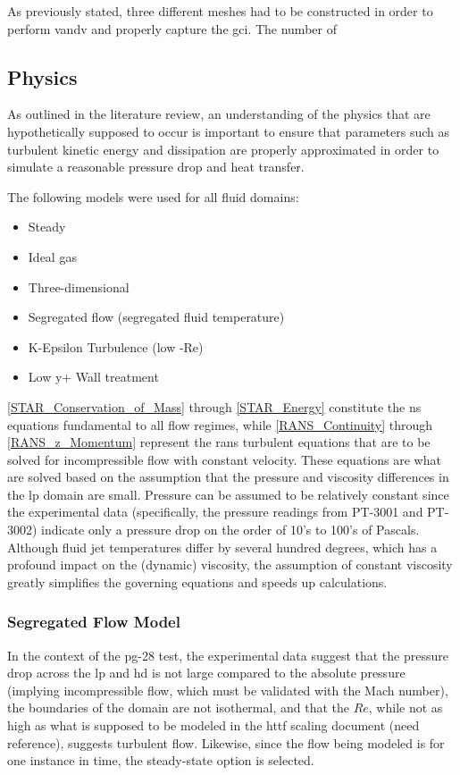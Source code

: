 \documentclass[double,12pt]{beavtex}
\begin{document}
As previously stated, three different meshes had to be constructed in order to perform \acrshort{vandv} and properly capture the \acrshort{gci}. The number of 

\subsection{Physics}

As outlined in the literature review, an understanding of the physics that are hypothetically supposed to occur is important to ensure that parameters such as turbulent kinetic energy and dissipation are properly approximated in order to simulate a reasonable pressure drop and heat transfer.

The following models were used for all fluid domains:
\begin{itemize}
    \item Steady
    \item Ideal gas
    \item Three-dimensional
    \item Segregated flow (segregated fluid temperature)
    \item K-Epsilon Turbulence (low -Re)
    \item Low y+ Wall treatment
\end{itemize}

\ref{STAR_Conservation_of_Mass} through \ref{STAR_Energy} constitute the \acrshort{ns} equations fundamental to all flow regimes, while \ref{RANS_Continuity} through \ref{RANS_z_Momentum} represent the \acrshort{rans} turbulent equations that are to be solved for incompressible flow with constant velocity. These equations are what are solved based on the assumption that the pressure and viscosity differences in the \acrshort{lp} domain are small. Pressure can be assumed to be relatively constant since the experimental data (specifically, the pressure readings from PT-3001 and PT-3002) indicate only a pressure drop on the order of 10's to 100's of Pascals. Although fluid jet temperatures differ by several hundred degrees, which has a profound impact on the (dynamic) viscosity, the assumption of constant viscosity greatly simplifies the governing equations and speeds up calculations. 

\subsubsection{Segregated Flow Model}

In the context of the \acrshort{pg}-28 test, the experimental data suggest that the pressure drop across the \acrshort{lp} and \acrshort{hd} is not large compared to the absolute pressure (implying incompressible flow, which must be validated with the Mach number), the boundaries of the domain are not isothermal, and that the $Re$, while not as high as what is supposed to be modeled in the \acrshort{httf} scaling document (need reference), suggests turbulent flow. Likewise, since the flow being modeled is for one instance in time, the steady-state option is selected.
\end{document}
